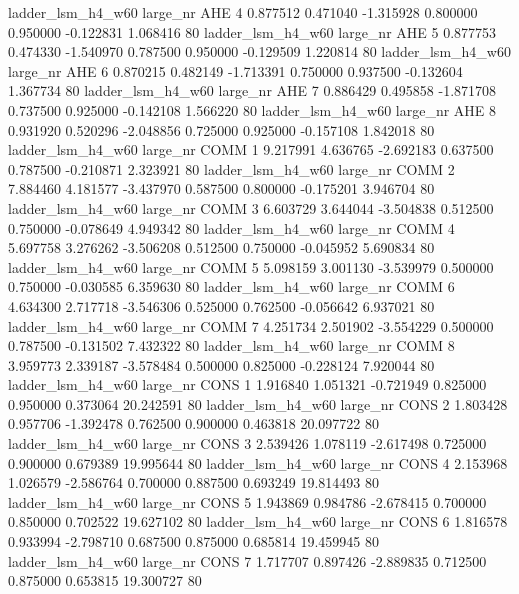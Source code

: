   ladder_lsm_h4_w60   large_nr      AHE                 4  0.877512  0.471040  -1.315928 0.800000 0.950000 -0.122831    1.068416 80
  ladder_lsm_h4_w60   large_nr      AHE                 5  0.877753  0.474330  -1.540970 0.787500 0.950000 -0.129509    1.220814 80
  ladder_lsm_h4_w60   large_nr      AHE                 6  0.870215  0.482149  -1.713391 0.750000 0.937500 -0.132604    1.367734 80
  ladder_lsm_h4_w60   large_nr      AHE                 7  0.886429  0.495858  -1.871708 0.737500 0.925000 -0.142108    1.566220 80
  ladder_lsm_h4_w60   large_nr      AHE                 8  0.931920  0.520296  -2.048856 0.725000 0.925000 -0.157108    1.842018 80
  ladder_lsm_h4_w60   large_nr     COMM                 1  9.217991  4.636765  -2.692183 0.637500 0.787500 -0.210871    2.323921 80
  ladder_lsm_h4_w60   large_nr     COMM                 2  7.884460  4.181577  -3.437970 0.587500 0.800000 -0.175201    3.946704 80
  ladder_lsm_h4_w60   large_nr     COMM                 3  6.603729  3.644044  -3.504838 0.512500 0.750000 -0.078649    4.949342 80
  ladder_lsm_h4_w60   large_nr     COMM                 4  5.697758  3.276262  -3.506208 0.512500 0.750000 -0.045952    5.690834 80
  ladder_lsm_h4_w60   large_nr     COMM                 5  5.098159  3.001130  -3.539979 0.500000 0.750000 -0.030585    6.359630 80
  ladder_lsm_h4_w60   large_nr     COMM                 6  4.634300  2.717718  -3.546306 0.525000 0.762500 -0.056642    6.937021 80
  ladder_lsm_h4_w60   large_nr     COMM                 7  4.251734  2.501902  -3.554229 0.500000 0.787500 -0.131502    7.432322 80
  ladder_lsm_h4_w60   large_nr     COMM                 8  3.959773  2.339187  -3.578484 0.500000 0.825000 -0.228124    7.920044 80
  ladder_lsm_h4_w60   large_nr     CONS                 1  1.916840  1.051321  -0.721949 0.825000 0.950000  0.373064   20.242591 80
  ladder_lsm_h4_w60   large_nr     CONS                 2  1.803428  0.957706  -1.392478 0.762500 0.900000  0.463818   20.097722 80
  ladder_lsm_h4_w60   large_nr     CONS                 3  2.539426  1.078119  -2.617498 0.725000 0.900000  0.679389   19.995644 80
  ladder_lsm_h4_w60   large_nr     CONS                 4  2.153968  1.026579  -2.586764 0.700000 0.887500  0.693249   19.814493 80
  ladder_lsm_h4_w60   large_nr     CONS                 5  1.943869  0.984786  -2.678415 0.700000 0.850000  0.702522   19.627102 80
  ladder_lsm_h4_w60   large_nr     CONS                 6  1.816578  0.933994  -2.798710 0.687500 0.875000  0.685814   19.459945 80
  ladder_lsm_h4_w60   large_nr     CONS                 7  1.717707  0.897426  -2.889835 0.712500 0.875000  0.653815   19.300727 80
